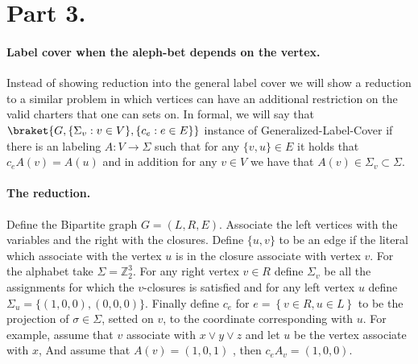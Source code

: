 \documentclass{article}
\begin{document}
\section{Part 3.}

\paragraph{Label cover when the aleph-bet depends on the vertex.} Instead of showing reduction into the general label cover we will show a reduction to a similar problem in which vertices can have an additional restriction on the valid charters that one can sets on. In formal, we will say that $\braket{G, \{ \Sigma_{v} : v \in V \}, \{c_{e} : e \in E \}} $ instance of Generalized-Label-Cover if there is an labeling $A : V \rightarrow \Sigma$ such that for any $\{v,u\} \in E$ it holds that $c_{e}A(v) = A(u)$ and in addition for any $v \in V$ we have that $A(v) \in \Sigma_{v} \subset \Sigma$.  

\paragraph{The reduction.} Define the Bipartite graph $G = (L,R,E)$. Associate the left vertices with the variables and the right with the closures. Define $\{u,v\}$ to be an edge if the literal which associate with the vertex $u$ is in the closure associate with vertex $v$. For the alphabet take $\Sigma = \mathbb{Z}_{2}^3$. For any right vertex $v\in R$ define $\Sigma_{v}$ be all the assignments for which the $v$-closures is satisfied and for any left vertex $u$ define $\Sigma_{u} = \{ \left( 1 , 0 , 0 \right), \left( 0 , 0, 0 \right) \}$. Finally define $c_{e}$ for $ e = \left\{ v \in R, u \in L \right\}$ to be the projection of $\sigma \in \Sigma$, setted on $v$, to the coordinate corresponding with $u$. For example, assume that $v$ associate with $x\vee y \vee z $ and let $u$ be the vertex associate with $x$, And assume that $A(v) = (1,0,1)$ , then $c_{e}A_{v} = (1,0,0)$.           

\end{document}
